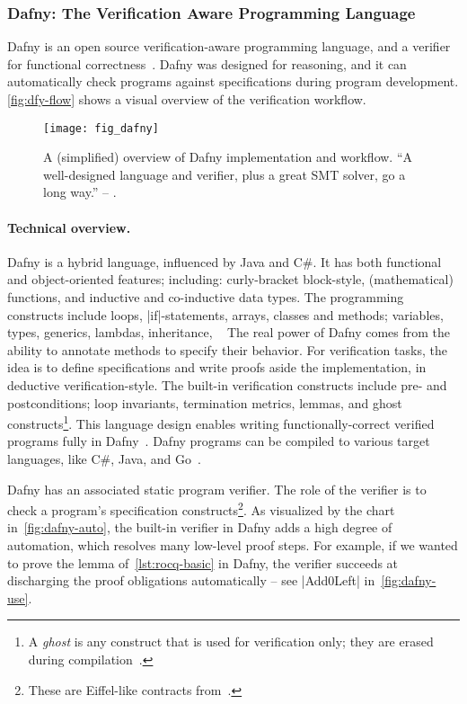 \subsubsection{Dafny: The Verification Aware Programming Language}
\label{subsec:dafny}

Dafny is an open source verification-aware programming language, and a verifier for functional correctness~\cite{leino2010,dafnylang}.
Dafny was designed for reasoning, and it can automatically check programs against specifications during program development.
\autoref{fig:dfy-flow} shows a visual overview of the verification workflow.

\begin{figure}[ht]
\centering
\texttt{[image: fig\_dafny]}
\caption[Overview of Dafny implementation and workflow]{
A (simplified) overview of Dafny implementation and workflow.
\enquote{A well-designed language and verifier, plus a great SMT solver, go a long way.} -- \textcite{leino2010b}.}
\label{fig:dfy-flow}
\end{figure}

\paragraph*{Technical overview.}
Dafny is a hybrid language, influenced by Java and C\#.
It has both functional and object-oriented features;
including: curly-bracket block-style, (mathematical) functions, and inductive and co-inductive data types.
The programming constructs include loops, \pr|if|-statements, arrays, classes and methods;
variables, types, generics, lambdas, inheritance, \etc~\cite{dafnydoc}
The real power of Dafny comes from the ability to annotate methods to specify their behavior.
For verification tasks, the idea is to define specifications and write proofs aside the implementation, in deductive verification-style.
The built-in verification constructs include pre- and postconditions;
loop invariants, termination metrics, lemmas, and ghost constructs\footnote{
A \emph{ghost} is any construct that is used for verification only; they are erased during compilation~\cite[p. 19]{leino2023}.}.
This language design enables writing functionally-correct verified programs fully in Dafny~\cite{leino2023}.
Dafny programs can be compiled to various target languages, like C\#, Java, and Go~\cite{dafnydoc}.

Dafny has an associated static program verifier.
The role of the verifier is to check a program's specification constructs\footnote{These are Eiffel-like contracts from~\cite{meyer1988}.}.
As visualized by the chart in~\autoref{fig:dafny-auto},
the built-in verifier in Dafny adds a high degree of automation, which resolves many low-level proof steps.
For example, if we wanted to prove the lemma of~\autoref{lst:rocq-basic} in Dafny, the verifier succeeds at discharging the proof obligations automatically -- see \pr|Add0Left| in~\autoref{fig:dafny-use}.

